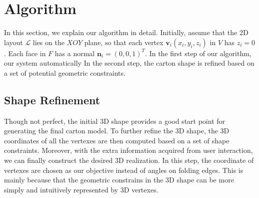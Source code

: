 \section{Algorithm}\label{sec:optimization}


In this section, we explain our algorithm in detail. 
Initially, assume that the 2D layout $\mathcal{L}$ lies on the $XOY$ plane, so that each vertex $\mathbf{v}_i(x_i,y_i,z_i)$ in $V$ has $z_i=0$. 
Each face in $F$ has a normal $\mathbf{n}_i=(0,0,1)^T$.
%
In the first step of our algorithm, our system automatically {\color{blue}{folds the original flat mesh into a rough model by assigning a specific angle to each folding edge.}}
In the second step, the carton shape is refined based on a set of potential geometric constraints.




\subsection{Shape Refinement}\label{sec:refinement}

Though not perfect, the initial 3D shape provides a good start point for generating the final carton model. 
%
To further refine the 3D shape, the 3D coordinates of all the vertexes are then computed based on a set of shape constraints.
%
Moreover, with the extra information acquired from user interaction, we can finally construct the desired 3D realization.
In this step, the coordinate of vertexes are chosen as our objective instead of angles on folding edges.
This is mainly because that the geometric constrains in the 3D shape can be more simply and intuitively represented by 3D vertexes.
 

